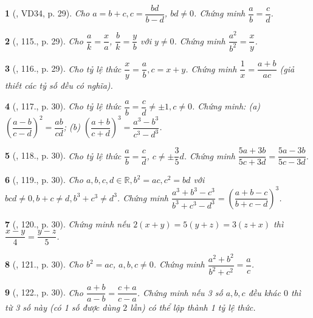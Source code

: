 \documentclass{article}
\newtheorem{baitoan}{}
\begin{document}
\begin{baitoan}[\cite{Tuyen_Toan_7}, VD34, p. 29]
	Cho $a = b + c,c = \dfrac{bd}{b - d}$, $bd\ne 0$. Chứng minh $\dfrac{a}{b} = \dfrac{c}{d}$.
\end{baitoan}

\begin{baitoan}[\cite{Tuyen_Toan_7}, 115., p. 29]
	Cho $\dfrac{a}{k} = \dfrac{x}{a}$, $\dfrac{b}{k} = \dfrac{y}{b}$ với $y\ne 0$. Chứng minh $\dfrac{a^2}{b^2} = \dfrac{x}{y}$.
\end{baitoan}

\begin{baitoan}[\cite{Tuyen_Toan_7}, 116., p. 29]
	Cho tỷ lệ thức $\dfrac{x}{y} = \dfrac{a}{b},c = x + y$. Chứng minh $\dfrac{1}{x} = \dfrac{a + b}{ac}$ (giả thiết các tỷ số đều có nghĩa).
\end{baitoan}

\begin{baitoan}[\cite{Tuyen_Toan_7}, 117., p. 30]
	Cho tỷ lệ thức $\dfrac{a}{b} = \dfrac{c}{d}\ne\pm 1,c\ne 0$. Chứng minh: (a) $\left(\dfrac{a - b}{c - d}\right)^2 = \dfrac{ab}{cd}$;
	(b) $\left(\dfrac{a + b}{c + d}\right)^3 = \dfrac{a^3 - b^3}{c^3 - d^3}$.	
\end{baitoan}

\begin{baitoan}[\cite{Tuyen_Toan_7}, 118., p. 30]
	Cho tỷ lệ thức $\dfrac{a}{b} = \dfrac{c}{d}$, $c\ne\pm\dfrac{3}{5}d$. Chứng minh $\dfrac{5a + 3b}{5c + 3d} = \dfrac{5a - 3b}{5c - 3d}$.
\end{baitoan}

\begin{baitoan}[\cite{Tuyen_Toan_7}, 119., p. 30]
	Cho $a,b,c,d\in\mathbb{R},b^2 = ac,c^2 = bd$ với $bcd\ne 0,b + c\ne d,b^3 + c^3\ne d^3$. Chứng minh $\dfrac{a^3 + b^3 - c^3}{b^3 + c^3 - d^3} = \left(\dfrac{a + b - c}{b + c - d}\right)^3$.
\end{baitoan}

\begin{baitoan}[\cite{Tuyen_Toan_7}, 120., p. 30]
	Chứng minh nếu $2(x + y) = 5(y + z) = 3(z + x)$ thì $\dfrac{x - y}{4} = \dfrac{y - z}{5}$.
\end{baitoan}

\begin{baitoan}[\cite{Tuyen_Toan_7}, 121., p. 30]
	Cho $b^2 = ac$, $a,b,c\ne 0$. Chứng minh $\dfrac{a^2 + b^2}{b^2 + c^2} = \dfrac{a}{c}$.
\end{baitoan}

\begin{baitoan}[\cite{Tuyen_Toan_7}, 122., p. 30]
	Cho $\dfrac{a + b}{a - b} = \dfrac{c + a}{c - a}$. Chứng minh nếu 3 số $a,b,c$ đều khác $0$ thì từ 3 số này (có 1 số được dùng $2$ lần) có thể lập thành 1 tỷ lệ thức.
\end{baitoan}
\end{document}

